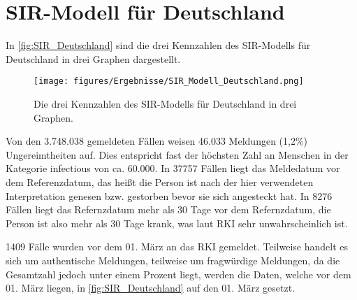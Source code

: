 \section{SIR-Modell für Deutschland}\label{sec:Resultate-SIR}
In \autoref{fig:SIR_Deutschland} sind die drei Kennzahlen des SIR-Modells für Deutschland in drei Graphen dargestellt.
\begin{figure}[H]
    \centering
    \texttt{[image: figures/Ergebnisse/SIR\_Modell\_Deutschland.png]}
    \caption{Die drei Kennzahlen des SIR-Modells für Deutschland in drei Graphen.}
    \label{fig:SIR_Deutschland}
\end{figure}

Von den 3.748.038 gemeldeten Fällen weisen 46.033  Meldungen (1,2\%) Ungereimtheiten auf. Dies entspricht fast der höchsten Zahl an Menschen in der Kategorie \glqq{}infectious\grqq{} von ca. 60.000.
In 37757 Fällen liegt das Meldedatum vor dem Referenzdatum, das heißt die Person ist nach der hier verwendeten Interpretation genesen bzw. gestorben bevor sie sich angesteckt hat. In 8276 Fällen liegt das Refernzdatum mehr als 30 Tage vor dem Refernzdatum, die Person ist also mehr als 30 Tage krank, was laut RKI sehr unwahrscheinlich ist.

1409 Fälle wurden vor dem 01. März an das RKI gemeldet. Teilweise handelt es sich um authentische Meldungen, teilweise um fragwürdige Meldungen, da die Gesamtzahl jedoch unter einem Prozent liegt, werden die Daten, welche vor dem 01. März liegen, in \autoref{fig:SIR_Deutschland} auf den 01. März gesetzt.